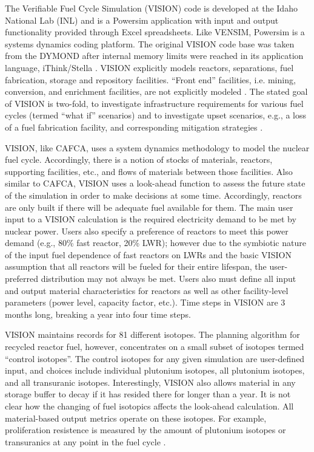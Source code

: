 The Verifiable Fuel Cycle Simulation (VISION) code is developed at the Idaho
National Lab (INL) and is a Powersim \cite{studio_powersim_2003} application
with input and output functionality provided through Excel spreadsheets. Like
VENSIM, Powersim is a systems dynamics coding platform. The original VISION code
base was taken from the DYMOND \cite{moisseytsev_dymond_2001} after internal
memory limits were reached in its application language, iThink/Stella
\cite{richmond_ithink_2004}. VISION explicitly models reactors, separations, fuel
fabrication, storage and repository facilities. ``Front end'' facilities,
i.e. mining, conversion, and enrichment facilities, are not explicitly modeled
\cite{guerin_benchmark_2009}. The stated goal of VISION is two-fold, to
investigate infrastructure requirements for various fuel cycles (termed ``what
if'' scenarios) \cite{jacobson_verifiable_2010} and to investigate upset
scenarios, e.g., a loss of a fuel fabrication facility, and corresponding
mitigation strategies \cite{schweitzer_improved_2008}.

VISION, like CAFCA, uses a system dynamics methodology to model the nuclear fuel
cycle. Accordingly, there is a notion of stocks of materials, reactors,
supporting facilities, etc., and flows of materials between those
facilities. Also similar to CAFCA, VISION uses a look-ahead function to assess
the future state of the simulation in order to make decisions at some
time. Accordingly, reactors are only built if there will be adequate fuel
available for them. The main user input to a VISION calculation is the required
electricity demand to be met by nuclear power. Users also specify a preference
of reactors to meet this power demand (e.g., 80\% fast reactor, 20\% LWR);
however due to the symbiotic nature of the input fuel dependence of fast
reactors on LWRs and the basic VISION assumption that all reactors will be
fueled for their entire lifespan, the user-preferred distribution may not always
be met. Users also must define all input and output material characteristics for
reactors as well as other facility-level parameters (power level, capacity
factor, etc.). Time steps in VISION are 3 months long, breaking a year into four
time steps.

VISION maintains records for 81 different isotopes. The planning algorithm for
recycled reactor fuel, however, concentrates on a small subset of isotopes
termed ``control isotopes''. The control isotopes for any given simulation are
user-defined input, and choices include individual plutonium isotopes, all
plutonium isotopes, and all transuranic isotopes. Interestingly, VISION also
allows material in any storage buffer to decay if it has resided there for
longer than a year. It is not clear how the changing of fuel isotopics affects
the look-ahead calculation. All material-based output metrics operate on these
isotopes. For example, proliferation resistence is measured by the amount of
plutonium isotopes or transuranics at any point in the fuel cycle
\cite{yacout_vision_2006}.

